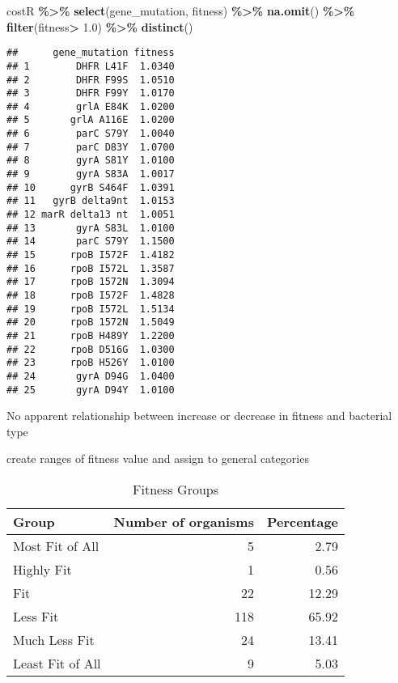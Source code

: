 \documentclass[
]{article}
\newenvironment{Shaded}{\begin{snugshade}}{\end{snugshade}}
\newcommand{\FloatTok}[1]{\textcolor[rgb]{0.00,0.00,0.81}{#1}}
\newcommand{\FunctionTok}[1]{\textcolor[rgb]{0.13,0.29,0.53}{\textbf{#1}}}
\newcommand{\NormalTok}[1]{#1}
\newcommand{\SpecialCharTok}[1]{\textcolor[rgb]{0.81,0.36,0.00}{\textbf{#1}}}
\begin{document}
\begin{Shaded}
\begin{Highlighting}[]
\NormalTok{costR }\SpecialCharTok{\%\textgreater{}\%} 
    \FunctionTok{select}\NormalTok{(gene\_mutation, fitness) }\SpecialCharTok{\%\textgreater{}\%} 
    \FunctionTok{na.omit}\NormalTok{() }\SpecialCharTok{\%\textgreater{}\%} 
    \FunctionTok{filter}\NormalTok{(fitness}\SpecialCharTok{\textgreater{}} \FloatTok{1.0}\NormalTok{) }\SpecialCharTok{\%\textgreater{}\%} 
    \FunctionTok{distinct}\NormalTok{()}
\end{Highlighting}
\end{Shaded}

\begin{verbatim}
##      gene_mutation fitness
## 1        DHFR L41F  1.0340
## 2        DHFR F99S  1.0510
## 3        DHFR F99Y  1.0170
## 4        grlA E84K  1.0200
## 5       grlA A116E  1.0200
## 6        parC S79Y  1.0040
## 7        parC D83Y  1.0700
## 8        gyrA S81Y  1.0100
## 9        gyrA S83A  1.0017
## 10      gyrB S464F  1.0391
## 11   gyrB delta9nt  1.0153
## 12 marR delta13 nt  1.0051
## 13       gyrA S83L  1.0100
## 14       parC S79Y  1.1500
## 15      rpoB I572F  1.4182
## 16      rpoB I572L  1.3587
## 17      rpoB 1572N  1.3094
## 18      rpoB I572F  1.4828
## 19      rpoB I572L  1.5134
## 20      rpoB 1572N  1.5049
## 21      rpoB H489Y  1.2200
## 22      rpoB D516G  1.0300
## 23      rpoB H526Y  1.0100
## 24       gyrA D94G  1.0400
## 25       gyrA D94Y  1.0100
\end{verbatim}

No apparent relationship between increase or decrease in fitness and
bacterial type

create ranges of fitness value and assign to general categories

\begin{table}[!t]
\caption*{
{\large Fitness Groups}
} 
\fontsize{12.0pt}{14.4pt}\selectfont
\begin{tabular*}{\linewidth}{@{\extracolsep{\fill}}lrr}
\toprule
Group & Number of organisms & Percentage \\ 
\midrule\addlinespace[2.5pt]
Most Fit of All & 5 & 2.79 \\ 
Highly Fit & 1 & 0.56 \\ 
Fit & 22 & 12.29 \\ 
Less Fit & 118 & 65.92 \\ 
Much Less Fit & 24 & 13.41 \\ 
Least Fit of All & 9 & 5.03 \\ 
\bottomrule
\end{tabular*}
\end{table}
\end{document}
